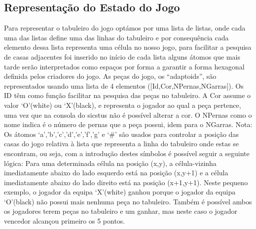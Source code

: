 \documentclass[a4paper]{article}
\begin{document}
\subsection{Representação do Estado do Jogo}  Para representar o tabuleiro do jogo optámos por uma lista de listas, onde cada uma das listas define uma das linhas do tabuleiro e por consequência cada elemento dessa lista representa uma célula no nosso jogo,  para facilitar a pesquisa de casas adjacentes foi inserido no início de cada lista alguns átomos que mais tarde serão interpretados como espaços por forma a garantir a forma hexagonal definida pelos criadores do jogo. As peças do jogo, os “adaptoids”, são representados usando uma lista de 4 elementos ([Id,Cor,NPernas,NGarras]). Os ID têm como função facilitar na pesquisa das peças no tabuleiro. A Cor assume o valor ‘O’(white) ou ‘X’(black), e representa o jogador ao qual a peça pertence, uma vez que na consola do sicstus não é possível alterar a cor. O NPernas como o nome indica é o número de pernas que a peça possui, idem para o NGarras. Nota: Os átomos ‘a’,’b’,’c’,'d','e','f','g' e ‘#’ são usados para controlar a posição das casas do jogo relativa à lista que representa a linha do tabuleiro onde estas se encontram, ou seja, com a introdução destes símbolos é possível seguir a seguinte lógica: Para uma determinada célula na posição (x,y), a célula-vizinha imediatamente abaixo do lado esquerdo está na posição (x,y+1) e a célula imediatamente abaixo do lado direito está na posição (x+1,y+1). Neste pequeno exemplo, o jogador da equipa ‘X’(white) ganhou porque o jogador da equipa ‘O’(black) não possui mais nenhuma peça no tabuleiro. Também é possível ambos os jogadores terem peças no tabuleiro e um ganhar, mas neste caso o jogador vencedor alcançou primeiro os 5 pontos.
\end{document}

